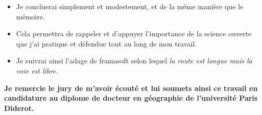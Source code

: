 \documentclass[12pt]{article}
\begin{document}
\bigskip

\begin{itemize}
    \item Je concluerai simplement et modestement, et de la même manière que le mémoire.
	\item Cela permettra de rappeler et d'appuyer l'importance de la science ouverte que j'ai pratique et défendue tout au long de mon travail.
	\item Je suivrai ainsi l'adage de framasoft selon lequel \textit{la route est longue mais la voie est libre}.
\end{itemize}


\bigskip

\textbf{
Je remercie le jury de m'avoir écouté et lui soumets ainsi ce travail en candidature au diplome de docteur en géographie de l'université Paris Diderot.
}













\end{document}

